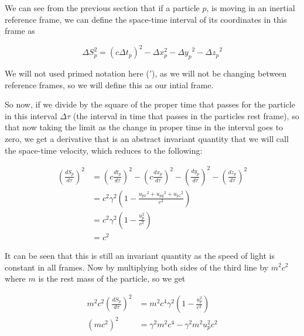We can see from the previous section that if a particle $p$, is moving in an inertial reference frame, we can define the space-time interval of its coordinates in this frame as

\begin{equation}
	\Delta S_p^2 = (c\Delta {t}_p)^2-\Delta x_p^2-{\Delta y_p}^2-{\Delta z_p}^2
\end{equation}

We will not used primed notation here ($'$), as we will not be changing between reference frames, so we will define this as our intial frame.

So now, if we divide by the square of the proper time that passes for the particle in this interval ${\Delta\tau}$ (the interval in time that passes in the particles rest frame), so that now taking the limit as the change in proper time in the interval goes to zero, we get a derivative that is an abstract invariant quantity that we will call the space-time velocity, which reduces to the following:

\begin{equation}
	\begin{aligned}
		\left(\frac{dS_p}{d\tau}\right)^2 & = \left(c\frac{{{dt}_{p}}}{d\tau}\right)^2-\left(c\frac{dx_p}{d\tau}\right)^2-\left(\frac{dy_p}{d\tau}\right)^2-\left(\frac{dz_p}{d\tau}\right)^2 \\
		                                  & = {c}^2\gamma^2 \left( 1-\frac{{{u}_{px}}^2 + {{u}_{py}}^2 + {{u}_{pz}}^2}{{c}^2} \right)\\
										  & = {c}^2\gamma^2 \left( 1-\frac{u_p^2}{{c}^2} \right) \\
		                                  & = {c}^2
	\end{aligned}
\end{equation}

It can be seen that this is still an invariant quantity as the speed of light is constant in all frames.
Now by multiplying both sides of the third line by ${m}^2{c}^2$ where $m$ is the rest mass of the particle, so we get

\begin{equation}
	\label{eq: energy-momentum derivation}
	\begin{aligned}
		m^2 {c}^2 \left(\frac{dS_p}{d\tau}\right)^2 & = m^2{c}^4\gamma^2 \left( 1-\frac{u_p^2}{{c}^2} \right)  \\
		({m}{c}^2)^2                                & = \gamma^2 m^2 c^4-\gamma^2 m^2 u_p^2 {c}^2
	\end{aligned}
\end{equation}


